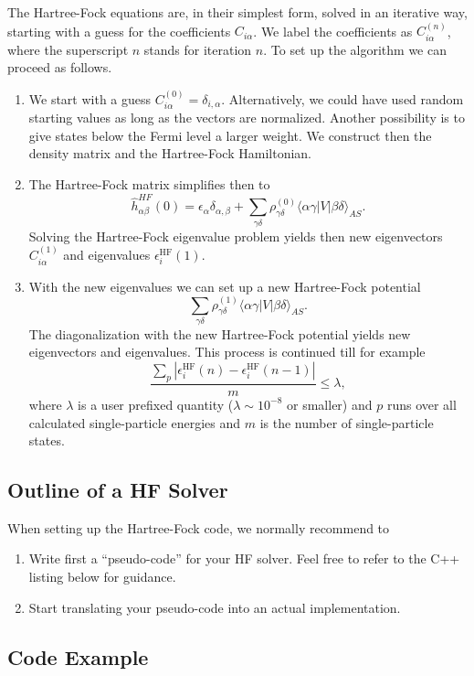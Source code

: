\documentclass[11pt,a4wide]{article}
\begin{document}
The Hartree-Fock equations are, in their simplest form, solved in an
iterative way, starting with a guess for the coefficients
$C_{i\alpha}$. We label the coefficients as $C_{i\alpha}^{(n)}$, where
the superscript $n$ stands for iteration $n$.  To set up the algorithm
we can proceed as follows.
\begin{enumerate}
\item We start with a guess
  $C_{i\alpha}^{(0)}=\delta_{i,\alpha}$. Alternatively, we could have
  used random starting values as long as the vectors are
  normalized. Another possibility is to give states below the Fermi
  level a larger weight. We construct then the density matrix and the 
Hartree-Fock Hamiltonian. 
\item The Hartree-Fock matrix simplifies then to
\[
\hat{h}_{\alpha\beta}^{HF}(0)=\epsilon_{\alpha}\delta_{\alpha,\beta}+
\sum_{\gamma\delta} \rho_{\gamma\delta}^{(0)}\langle \alpha\gamma|V|\beta\delta\rangle_{AS}.
\]
Solving the Hartree-Fock eigenvalue problem yields then new eigenvectors $C_{i\alpha}^{(1)}$ and eigenvalues
$\epsilon_i^{\mathrm{HF}}(1)$. 
\item With the new eigenvalues we can set up a new Hartree-Fock potential 
\[
\sum_{\gamma\delta} \rho_{\gamma\delta}^{(1)}\langle \alpha\gamma|V|\beta\delta\rangle_{AS}.
\]
The diagonalization with the new Hartree-Fock potential yields new eigenvectors and eigenvalues.
This process is continued till for example
\[
\frac{\sum_{p} |\epsilon_i^{\mathrm{HF}}(n)-\epsilon_i^{\mathrm{HF}}(n-1)|}{m}\le \lambda,  
\]
where $\lambda$ is a user prefixed quantity ($\lambda \sim 10^{-8}$ or smaller) and $p$ runs over all calculated single-particle
energies and $m$ is the number of single-particle states.
\end{enumerate}



\subsection*{Outline of a HF Solver}
When setting up the Hartree-Fock code, we normally recommend to 
\begin{enumerate}
\item Write first a ``pseudo-code'' for your HF solver. Feel free to refer to the C++ listing below for guidance.  
\item Start translating your pseudo-code into an actual implementation. 
\end{enumerate}


\subsection*{Code Example}
  
\end{document}
